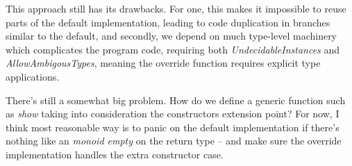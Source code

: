 \documentclass{article}
\begin{document}
This approach still has its drawbacks. For one, this makes it impossible to
reuse parts of the default implementation, leading to code duplication in
branches similar to the default, and secondly, we depend on much type-level
machinery which complicates the program code, requiring both
\emph{UndecidableInstances} and \emph{AllowAmbigousTypes}, meaning the override
function requires explicit type applications.

There's still a somewhat big problem. How do we define a generic function such as
\emph{show} taking into consideration the constructors extension point? For
now, I think most reasonable way is to panic on the default implementation if there's
nothing like an \emph{monoid empty} on the return type -- and make sure the
override implementation handles the extra constructor case.
\end{document}
